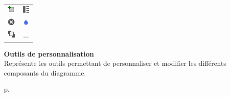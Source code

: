 \begin{minipage}[c]{.2\textwidth}
	\begin{rightborder}\begin{tabular}{cc}
		\includegraphics{images/icon/pointer-grip.png} &
		\includegraphics{images/icon/alignLeft.png} \\
		\includegraphics{images/icon/delete.png} &
		\includegraphics{images/icon/color.png} \\
		\includegraphics{images/icon/top.png} &
		... \\
	\end{tabular}\end{rightborder}
\end{minipage}
\begin{minipage}[c]{.1\textwidth}\end{minipage}
\begin{minipage}[c]{.6\textwidth}
	\textbf{Outils de personnalisation} \\
	Représente les outils permettant de personnaliser et modifier les différents composants du diagramme.
\end{minipage}
\begin{minipage}[c]{.1\textwidth}
	\hfill
	p.{\LARGE \pageref{ch:outils}}
\end{minipage}